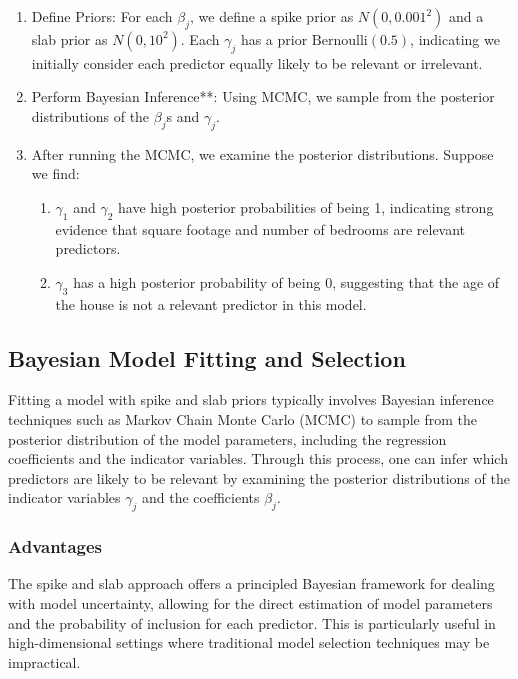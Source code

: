 \documentclass{article}
\begin{document}
\begin{enumerate}
    \item Define Priors: For each \( \beta_j \), we define a spike prior as \(N(0, 0.001^2)\) and a slab prior as \(N(0, 10^2)\). Each \( \gamma_j \) has a prior \(\text{Bernoulli}(0.5)\), indicating we initially consider each predictor equally likely to be relevant or irrelevant.
    \item Perform Bayesian Inference**: Using MCMC, we sample from the posterior distributions of the \( \beta_j \)s and \( \gamma_j \). 
    \item  After running the MCMC, we examine the posterior distributions. Suppose we find:
    \begin{enumerate}
        \item \( \gamma_1 \) and \( \gamma_2 \) have high posterior probabilities of being 1, indicating strong evidence that square footage and number of bedrooms are relevant predictors.
        \item \( \gamma_3 \) has a high posterior probability of being 0, suggesting that the age of the house is not a relevant predictor in this model.
\end{enumerate}

    \end{enumerate}

\subsection{Bayesian Model Fitting and Selection}

Fitting a model with spike and slab priors typically involves Bayesian inference techniques such as Markov Chain Monte Carlo (MCMC) to sample from the posterior distribution of the model parameters, including the regression coefficients and the indicator variables. Through this process, one can infer which predictors are likely to be relevant by examining the posterior distributions of the indicator variables \( \gamma_j \) and the coefficients \( \beta_j \).

\subsubsection{Advantages}

The spike and slab approach offers a principled Bayesian framework for dealing with model uncertainty, allowing for the direct estimation of model parameters and the probability of inclusion for each predictor. This is particularly useful in high-dimensional settings where traditional model selection techniques may be impractical.
\end{document}
